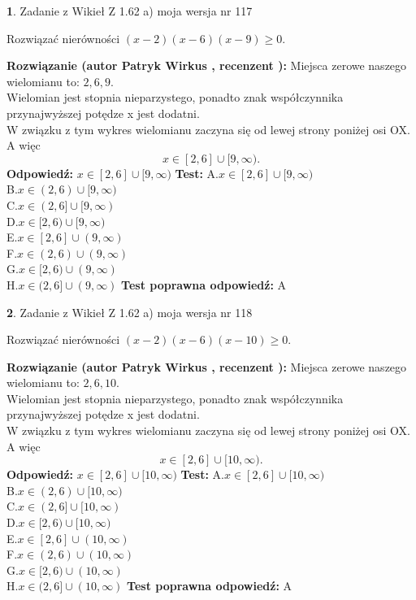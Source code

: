 \documentclass[12pt, a4paper]{article}
\theoremstyle{definition} %
\newtheorem{zad}{}
\newcommand{\zadStart}[1]{\begin{zad}#1\newline}
\newcommand{\zadStop}{\end{zad}}
\newcommand{\rozwStart}[2]{\noindent \textbf{Rozwiązanie (autor #1 , recenzent #2): }\newline}
\newcommand{\rozwStop}{\newline}
\newcommand{\odpStart}{\noindent \textbf{Odpowiedź:}\newline}
\newcommand{\odpStop}{\newline}
\newcommand{\testStart}{\noindent \textbf{Test:}\newline}
\newcommand{\testStop}{\newline}
\newcommand{\kluczStart}{\noindent \textbf{Test poprawna odpowiedź:}\newline}
\newcommand{\kluczStop}{\newline}
\begin{document}
\zadStart{Zadanie z Wikieł Z 1.62 a) moja wersja nr 117}

Rozwiązać nierówności $(x-2)(x-6)(x-9)\ge0$.
\zadStop
\rozwStart{Patryk Wirkus}{}
Miejsca zerowe naszego wielomianu to: $2, 6, 9$.\\
Wielomian jest stopnia nieparzystego, ponadto znak współczynnika przy\linebreak najwyższej potędze x jest dodatni.\\ W związku z tym wykres wielomianu zaczyna się od lewej strony poniżej osi OX. A więc $$x \in [2,6] \cup [9,\infty).$$
\rozwStop
\odpStart
$x \in [2,6] \cup [9,\infty)$
\odpStop
\testStart
A.$x \in [2,6] \cup [9,\infty)$\\
B.$x \in (2,6) \cup [9,\infty)$\\
C.$x \in (2,6] \cup [9,\infty)$\\
D.$x \in [2,6) \cup [9,\infty)$\\
E.$x \in [2,6] \cup (9,\infty)$\\
F.$x \in (2,6) \cup (9,\infty)$\\
G.$x \in [2,6) \cup (9,\infty)$\\
H.$x \in (2,6] \cup (9,\infty)$
\testStop
\kluczStart
A
\kluczStop



\zadStart{Zadanie z Wikieł Z 1.62 a) moja wersja nr 118}

Rozwiązać nierówności $(x-2)(x-6)(x-10)\ge0$.
\zadStop
\rozwStart{Patryk Wirkus}{}
Miejsca zerowe naszego wielomianu to: $2, 6, 10$.\\
Wielomian jest stopnia nieparzystego, ponadto znak współczynnika przy\linebreak najwyższej potędze x jest dodatni.\\ W związku z tym wykres wielomianu zaczyna się od lewej strony poniżej osi OX. A więc $$x \in [2,6] \cup [10,\infty).$$
\rozwStop
\odpStart
$x \in [2,6] \cup [10,\infty)$
\odpStop
\testStart
A.$x \in [2,6] \cup [10,\infty)$\\
B.$x \in (2,6) \cup [10,\infty)$\\
C.$x \in (2,6] \cup [10,\infty)$\\
D.$x \in [2,6) \cup [10,\infty)$\\
E.$x \in [2,6] \cup (10,\infty)$\\
F.$x \in (2,6) \cup (10,\infty)$\\
G.$x \in [2,6) \cup (10,\infty)$\\
H.$x \in (2,6] \cup (10,\infty)$
\testStop
\kluczStart
A
\kluczStop
\end{document}
